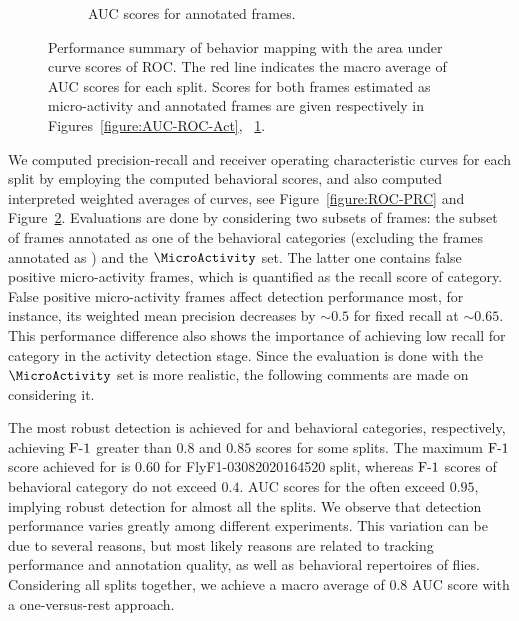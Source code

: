\begin{figure}[htb!]
\begin{subfigure}[b]{0.5\linewidth}
		\caption{AUC scores for annotated frames. \label{figure:AUC-ROC-Ann}}
	\end{subfigure}%
	\caption[Performance summary of behavior mapping with the area under curve scores of ROC.]
	{Performance summary of behavior mapping with the area under curve scores of ROC.
		The red line indicates the macro average of AUC scores for each split.
		Scores for both frames estimated as micro-activity and annotated frames are given respectively in Figures~\ref{figure:AUC-ROC-Act}, ~\ref{figure:AUC-ROC-Ann}.
		\label{figure:AUC}}
\end{figure}

We computed precision-recall and receiver operating characteristic curves for each split by employing the computed behavioral scores, and also computed interpreted weighted averages of curves, see Figure~\ref{figure:ROC-PRC} and Figure~\ref{figure:AUC}.
Evaluations are done by considering two subsets of frames: the subset of frames annotated as one of the behavioral categories (excluding the frames annotated as \QuiescentOther) and the $\MicroActivity$ set.
The latter one contains false positive micro-activity frames, which is quantified as the recall score of \QuiescentOther category.
False positive micro-activity frames affect \HaltereSwitch detection performance most, for instance, its weighted mean precision decreases by ${\sim}0.5$ for fixed recall at ${\sim}0.65$.
This performance difference also shows the importance of achieving low recall for \QuiescentOther category in the activity detection stage.
Since the evaluation is done with the $\MicroActivity$ set is more realistic, the following comments are made on considering it.

The most robust detection is achieved for \ProboscisPumping and \PosturalAdjustment behavioral categories, respectively, achieving $\textnormal{F-}1$ greater than $0.8$ and $0.85$ scores for some splits.
The maximum $\textnormal{F-}1$ score achieved for \Grooming is $0.60$ for FlyF1-03082020164520 split, whereas $\textnormal{F-}1$ scores of \HaltereSwitch behavioral category do not exceed $0.4$.
AUC scores for the \ProboscisPumping often exceed $0.95$, implying robust detection for almost all the splits.
We observe that detection performance varies greatly among different experiments. This variation can be due to several reasons, but most likely reasons are related to tracking performance and annotation quality, as well as behavioral repertoires of flies.
Considering all splits together, we achieve a macro average of $0.8$ AUC score with a one-versus-rest approach.

